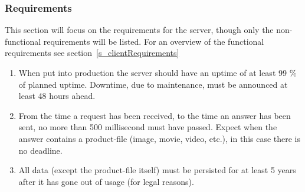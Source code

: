 \subsubsection{Requirements}
\label{s_serviceRequirements}
This section will focus on the requirements for the server, though only the non-functional requirements will be listed. For an overview of the functional requirements see section~\ref{s_clientRequirements}
\\
\begin{enumerate}
	\item When put into production the server should have an uptime of at least 99 \% of planned uptime. Downtime, due to maintenance, must be announced at least 48 hours ahead.
	\item From the time a request has been received, to the time an answer has been sent, no more than 500 millisecond must have passed. Expect when the answer contains a product-file (image, movie, video, etc.), in this case there is no deadline.
	\item All data (except the product-file itself) must be persisted for at least 5 years after it has gone out of usage (for legal reasons).
\end{enumerate}
\newpage